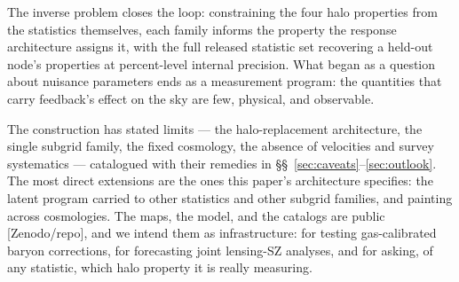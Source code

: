 \documentclass[linenumbers,trackchanges, twocolumn]{aastex701}
\begin{document}
The inverse problem closes the loop: constraining the four halo properties from the statistics themselves, each family informs the property the response architecture assigns it, with the full released statistic set recovering a held-out node's properties at percent-level internal precision. What began as a question about nuisance parameters ends as a measurement program: the quantities that carry feedback's effect on the sky are few, physical, and observable.
 
The construction has stated limits --- the halo-replacement architecture, the single subgrid family, the fixed cosmology, the absence of velocities and survey systematics --- catalogued with their remedies in \S\S~\ref{sec:caveats}--\ref{sec:outlook}. The most direct extensions are the ones this paper's architecture specifies: the latent program carried to other statistics and other subgrid families, and painting across cosmologies. The maps, the model, and the catalogs are public [Zenodo/repo], and we intend them as infrastructure: for testing gas-calibrated baryon corrections, for forecasting joint lensing-SZ analyses, and for asking, of any statistic, which halo property it is really measuring.
 

 

\begin{acknowledgments}
\end{acknowledgments}

\begin{contribution}



\end{contribution}
\end{document}
